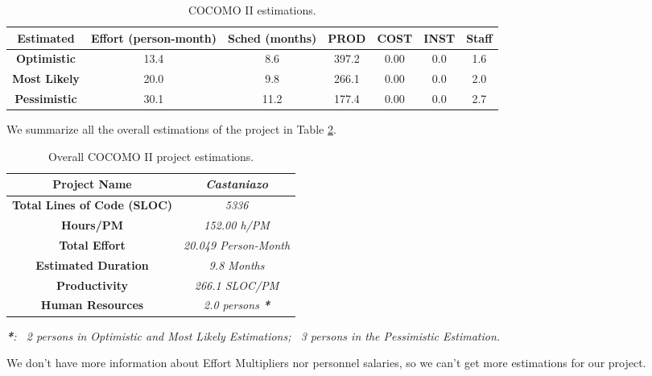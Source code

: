 \begin{table}
\begin{tabular}{c|c|c|c|c|c|c}
\textbf{Estimated} & \textbf{Effort (person-month)} & \textbf{Sched (months)} & \textbf{PROD} & \textbf{COST} & \textbf{INST} & \textbf{Staff} \\ \hline
\textbf{Optimistic} & 13.4 & 8.6 & 397.2 & 0.00 & 0.0 & 1.6 \\
\textbf{Most Likely} & 20.0 & 9.8 & 266.1 & 0.00 & 0.0 & 2.0 \\
\textbf{Pessimistic} & 30.1 & 11.2 & 177.4 & 0.00 & 0.0 & 2.7 \\ \hline
\end{tabular}
\label{tbl_Problem1}
\caption{COCOMO II estimations.}
\end{table}

We summarize all the overall estimations of the project in Table \ref{tbl_Problem1_ALL}.

\begin{table}
\begin{tabular}{|c|c|} \hline
\textbf{Project Name} & \emph{Castaniazo} \\ \hline
\textbf{Total Lines of Code (SLOC)} & \emph{5336} \\ \hline
\textbf{Hours/PM} & \emph{152.00 h/PM} \\ \hline
\textbf{Total Effort} & \emph{20.049 Person-Month} \\ \hline
\textbf{Estimated Duration} & \emph{9.8 Months} \\ \hline
\textbf{Productivity} & \emph{266.1 SLOC/PM} \\ \hline
\textbf{Human Resources} & \emph{2.0 persons \textbf{*}} \\ \hline
\end{tabular}
\label{tbl_Problem1_ALL}
\caption{Overall COCOMO II project estimations.}
\end{table}

\textit{\textbf{*}: ~2 persons in Optimistic and Most Likely Estimations; ~3 persons in the Pessimistic Estimation.}

We don't have more information about Effort Multipliers nor personnel salaries, so we can't get more estimations for our project.
